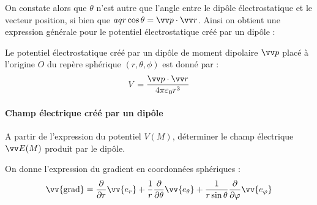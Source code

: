 \documentclass[11pt,fleqn]{book} %
\newcommand{\grad}{\vv{\mathrm{grad}}}
\begin{document}
On constate alors que $\theta$ n'est autre que l'angle entre le dipôle électrostatique et le vecteur position, si bien que $a q r \cos \theta = \vv p \cdot \vv r$. Ainsi on obtient une expression générale pour le potentiel électrostatique créé par un dipôle :

\begin{proposition}
    Le potentiel électrostatique créé par un dipôle de moment dipolaire $\vv p$ placé à l'origine $O$ du repère sphérique $(r,\theta,\phi)$ est donné par :
    \begin{equation}
        V = \frac{\vv p \cdot \vv r}{4 \pi \varepsilon_0 r^3}
    \end{equation}
\end{proposition}


\paragraph{Champ électrique créé par un dipôle}

\begin{capex}
A partir de l'expression du potentiel $V(M)$, déterminer le champ électrique $\vv E(M)$ produit par le dipôle.

On donne l'expression du gradient en coordonnées sphériques :
\begin{equation}
    \grad = \frac{\partial}{\partial r} \vv{e_r} + \frac{1}{r} \frac{\partial}{\partial \theta}  \vv{e_\theta} + \frac{1}{r \sin \theta} \frac{\partial}{\partial \varphi}  \vv{e_\varphi}
\end{equation}
\end{capex}

\end{document}
